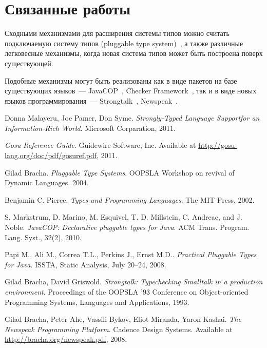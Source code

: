 \documentclass{article}
\begin{document}
\section{Связанные работы}
Сходными механизмами для расширения системы типов можно считать подключаемую систему типов (pluggable type system)~\cite{bracha}, а также различные легковесные механизмы, когда новая система типов может быть построена поверх существующей.

Подобные механизмы могут быть реализованы как в виде пакетов на базе существующих языков~--- JavaCOP~\cite{javacop2010}, Checker Framework~\cite{checkerframework2008},
так и в виде новых языков программирования~--- Strongtalk~\cite{strongtalk1993}, Newspeak~\cite{newspeak2008}.

\begin{thebibliography}{9}

    Donna Malayeru, Joe Pamer, Don Syme.
    \emph{Strongly-Typed Language Supportfor an Information-Rich World}.
    Microsoft Corparation,
    2011.

    \emph{Gosu Reference Guide}.
    Guidewire Software, Inc.
    Available at \url{http://gosu-lang.org/doc/pdf/gosuref.pdf},
    2011.

    Gilad Bracha.
    \emph{Pluggable Type Systems}.
    OOPSLA Workshop on revival of Dynamic Languages.
    2004.

    Benjamin C. Pierce.
    \emph{Types and Programming Languages}.
    The MIT Press, 2002.

    S. Markstrum, D. Marino, M. Esquivel, T. D. Millstein, C. Andreae, and J. Noble.
    \emph{JavaCOP: Declarative pluggable types for Java}.
    ACM Trans. Program. Lang. Syst., 32(2), 2010.

    Papi M., Ali M., Correa T.L., Perkins J., Ernst M.D..
    \emph{Practical Pluggable Types for Java}.
    ISSTA, Static Analysis, July 20–24, 2008.

    Gilad Bracha, David Griswold.
    \emph{Strongtalk: Typechecking Smalltalk in a production environment}.
    Proceedings of the OOPSLA '93 Conference on Object-oriented Programming Systems, Languages and Applications, 1993.

    Gilad Bracha, Peter Ahe, Vassili Bykov, Eliot Miranda, Yaron Kashai.
    \emph{The Newspeak Programming Platform}.
    Cadence Design Systems.
    Available at \url{http://bracha.org/newspeak.pdf},
    2008.

\end{thebibliography}
\end{document}
